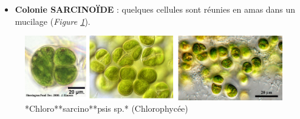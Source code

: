 \documentclass[
]{book}
\providecommand{\tightlist}{%
  \setlength{\itemsep}{0pt}\setlength{\parskip}{0pt}}
\begin{document}
\begin{itemize}
\tightlist
\item
  \textbf{Colonie SARCINOÏDE} : quelques cellules sont réunies en amas dans un mucilage (\emph{Figure \ref{fig:sarcino}}).
\end{itemize}

\begin{figure}[H]

{\centering \includegraphics[width=0.7\linewidth]{./images/chlorosarcinopsis} 

}

\caption{*Chloro**sarcino**psis sp.* (Chlorophycée)}\label{fig:sarcino}
\end{figure}
\end{document}
